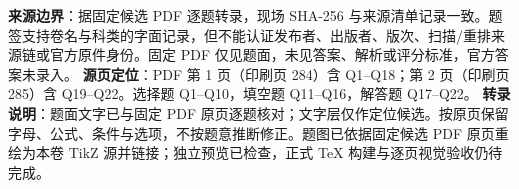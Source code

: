 

\begin{gktip}
\textbf{来源边界}：据固定候选 PDF 逐题转录，现场 SHA-256 与来源清单记录一致。题签支持卷名与科类的字面记录，但不能认证发布者、出版者、版次、扫描/重排来源链或官方原件身份。固定 PDF 仅见题面，未见答案、解析或评分标准，官方答案未录入。
\textbf{源页定位}：PDF 第 1 页（印刷页 284）含 Q1–Q18；第 2 页（印刷页 285）含 Q19–Q22。选择题 Q1–Q10，填空题 Q11–Q16，解答题 Q17–Q22。
\textbf{转录说明}：题面文字已与固定 PDF 原页逐题核对；文字层仅作定位候选。按原页保留字母、公式、条件与选项，不按题意推断修正。题图已依据固定候选 PDF 原页重绘为本卷 TikZ 源并链接；独立预览已检查，正式 TeX 构建与逐页视觉验收仍待完成。
\end{gktip}


